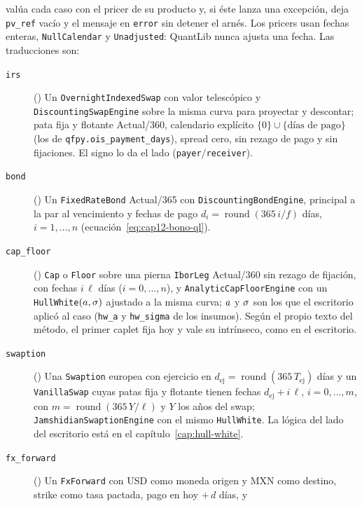  valúa cada caso con el pricer de su producto y, si éste lanza una
excepción, deja \texttt{pv\_ref} vacío y el mensaje en \texttt{error} sin detener el arnés. Los pricers usan fechas
enteras, \texttt{NullCalendar} y \texttt{Unadjusted}: QuantLib nunca ajusta una fecha. Las traducciones son:
\begin{description}
  \item[\texttt{irs}] () Un \texttt{OvernightIndexedSwap} con valor
    telescópico y \texttt{DiscountingSwapEngine} sobre la misma curva para proyectar y descontar; pata fija y flotante
    Actual/360, calendario explícito $\{0\} \cup \{\text{días de pago}\}$ (los de \texttt{qfpy.ois\_payment\_days}), spread cero, sin
    rezago de pago y sin fijaciones. El signo lo da el lado (\texttt{payer}/\texttt{receiver}).
  \item[\texttt{bond}] () Un \texttt{FixedRateBond} Actual/365 con
    \texttt{DiscountingBondEngine}, principal a la par al vencimiento y fechas de pago
    $d_i = \operatorname{round}(365\,i/f)$ días, $i = 1,\dots,n$ (ecuación~\eqref{eq:cap12-bono-ql}).
  \item[\texttt{cap\_floor}] () \texttt{Cap} o \texttt{Floor} sobre una
    pierna \texttt{IborLeg} Actual/360 sin rezago de fijación, con fechas $i\,\ell$ días ($i = 0,\dots,n$), y
    \texttt{AnalyticCapFloorEngine} con un \texttt{HullWhite}$(a, \sigma)$ ajustado a la misma curva; $a$ y $\sigma$
    son los que el escritorio aplicó al caso (\texttt{hw\_a} y \texttt{hw\_sigma} de los insumos). Según el propio texto del
    método, el primer caplet fija hoy y vale su intrínseco, como en el escritorio.
  \item[\texttt{swaption}] () Una \texttt{Swaption} europea con ejercicio
    en $d_{\mathrm{ej}} = \operatorname{round}(365\,T_{\mathrm{ej}})$ días y un \texttt{VanillaSwap} cuyas patas fija y flotante
    tienen fechas $d_{\mathrm{ej}} + i\,\ell$, $i = 0,\dots,m$, con $m = \operatorname{round}(365\,Y/\ell)$ y $Y$ los años del
    swap; \texttt{JamshidianSwaptionEngine} con el mismo \texttt{HullWhite}. La lógica del lado del escritorio está en el
    capítulo~\ref{cap:hull-white}.
  \item[\texttt{fx\_forward}] () Un \texttt{FxForward} con USD como
    moneda origen y MXN como destino, strike como tasa pactada, pago en hoy $+\,d$ días, y

\end{description}

